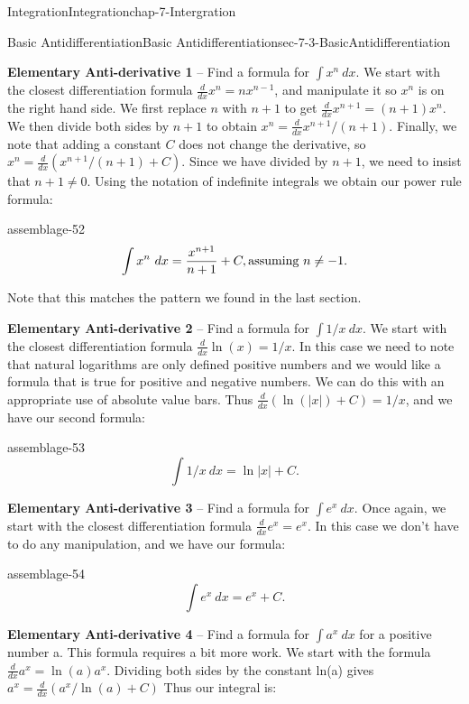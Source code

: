 \documentclass[oneside,10pt,]{book}
\newcommand{\terminology}[1]{\textbf{#1}}
\numberwithin{equation}{section}
\begin{document}
\begin{chapterptx}{Integration}{}{Integration}{}{}{chap-7-Intergration}
\begin{sectionptx}{Basic Antidifferentiation}{}{Basic Antidifferentiation}{}{}{sec-7-3-BasicAntidifferentiation}
\par
\hypertarget{p-2725}{}%
\terminology{Elementary Anti-derivative 1} – Find a formula for \(\int x^n\  dx\). We start with the closest differentiation formula \(\frac{d}{dx} x^n=nx^{n-1}\), and manipulate it so \(x^n\) is on the right hand side.  We first replace \(n\) with \(n+1\) to get \(\frac{d}{dx}  x^{n+1}=(n+1)x^n\).  We then divide both sides by \(n+1\) to obtain \(x^n=\frac{d}{dx}   x^{n+1}/(n+1)\).  Finally, we note that adding a constant \(C\) does not change the derivative, so  \(x^n=\frac{d}{dx}  (x^{n+1}/(n+1)+C)\).  Since we have divided by \(n+1\), we need to insist that \(n+1\ne 0\).  Using the notation of indefinite integrals we obtain our power rule formula:%
\begin{assemblage}{}{assemblage-52}%
\hypertarget{p-2726}{}%
%
\begin{equation*}
\int x^n\  dx=\frac{x^{n+1}}{n+1}+C, \hbox{assuming }n\ne -1.
\end{equation*}
%
\end{assemblage}
\hypertarget{p-2727}{}%
Note that this matches the pattern we found in the last section.%
\par
\hypertarget{p-2728}{}%
\terminology{Elementary Anti-derivative 2} – Find a formula for \(\int 1/x \ dx\). We start with the closest differentiation formula \(\frac{d}{dx}   \ln (x)=1/x\).  In this case we need to note that natural logarithms are only defined positive numbers and we would like a formula that is true for positive and negative numbers.  We can do this with an appropriate use of absolute value bars.  Thus \(\frac{d}{dx} (\ln(|x|)+C)=1/x\), and we have our second formula:%
\begin{assemblage}{}{assemblage-53}%
\hypertarget{p-2729}{}%
%
\begin{equation*}
\int 1/x\  dx=\ln |x|+C.
\end{equation*}
%
\end{assemblage}
\hypertarget{p-2730}{}%
\terminology{Elementary Anti-derivative 3} – Find a formula for \(\int e^x\  dx\). Once again, we start with the closest differentiation formula \(\frac{d}{dx}  e^x=e^x\). In this case we don't have to do any manipulation, and we have our formula:%
\begin{assemblage}{}{assemblage-54}%
\hypertarget{p-2731}{}%
%
\begin{equation*}
\int e^x \ dx=e^x+C.
\end{equation*}
%
\end{assemblage}
\hypertarget{p-2732}{}%
\terminology{Elementary Anti-derivative 4} – Find a formula for \(\int a^x\  dx\) for a positive number a. This formula requires a bit more work.  We start with the formula \(\frac{d}{dx}  a^x=\ln (a) a^x\).   Dividing both sides by the constant ln(a) gives \(a^x=\frac{d}{dx}  (a^x/\ln (a) +C)\)  Thus our integral is:%

\end{sectionptx}
\end{chapterptx}
\end{document}
